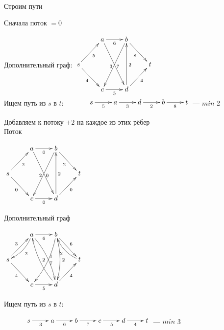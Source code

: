 \documentclass[a4paper, 12pt] {article}
\begin{document}
Строим пути

Сначала поток $ =0 $

Дополнительный граф:
$\begin{matrix}
	\xymatrix{
		& a  \ar@{->}[r]_6 \ar@{->}[rdd]_3 & b \ar@{->}[rd]_8 \\
		s \ar@{->}[rd]_4 \ar@{->}[ru]_5 &  & & t \\
		& c \ar@{->}[r]_5 \ar@{<-}[ruu]_7 & d \ar@{->}[ru]_4 \ar@{->}[uu]_2 \\
	}
\end{matrix}$\\

Ищем путь из $ s $ в $ t :$
$\begin{matrix}
	\xymatrix{
		& s  \ar@{->}[r]_5 & a \ar@{->}[r]_3 & d \ar@{->}[r]_2 & b \ar@{->}[r]_8 & t \\
	}
\end{matrix}$ --- $ min $ 2

Добавляем к потоку $ +2 $ на каждое из этих рёбер\\



Поток

$\begin{matrix}
	\xymatrix{
		& a  \ar@{->}[r]_0 \ar@{->}[rdd]_2 & b \ar@{->}[rd]_2 \\
		s \ar@{->}[rd]_0 \ar@{->}[ru]_2 &  & & t \\
		& c \ar@{->}[r]_0 \ar@{<-}[ruu]_0 & d \ar@{->}[ru]_0 \ar@{->}[uu]_2 \\
	}
\end{matrix}$

Дополнительный граф

$\begin{matrix}
	\xymatrix{
		& a  \ar@{->}[r]_6 \ar@/^/[ld]^2 \ar@/^/[rdd]^1  & b \ar@{->}[rd]^6 \ar@/^/[ldd]^7 \ar@/^/[dd]^2 \\
		s \ar@{->}[rd]_4 \ar@{->}[ru]^3 &  & & t \ar@/^/[lu]^2\\
		& c \ar@{->}[r]_5  & d \ar@{->}[ru]_4 \ar@/^/[luu]_2 \\
	}
\end{matrix}$

Ищем путь из $ s $ в $ t :$

$\begin{matrix}
	\xymatrix{
		& s  \ar@{->}[r]_3 & a \ar@{->}[r]_6 & b \ar@{->}[r]_7 & c \ar@{->}[r]_5 & d \ar@{->}[r]_4 & t \\
	}
\end{matrix}$ --- $ min $ 3
\end{document}
